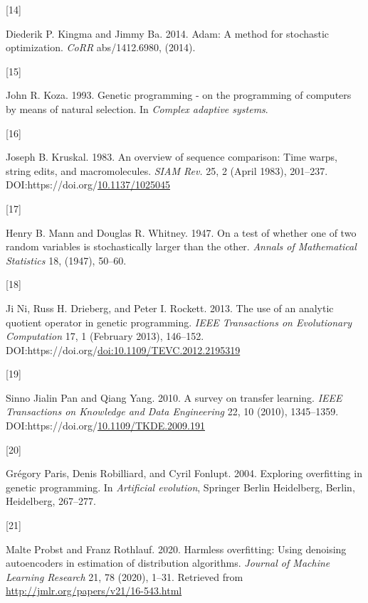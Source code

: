 \documentclass[
  11pt,
]{article}
\newlength{\cslhangindent}
\newlength{\csllabelwidth}
\newlength{\cslentryspacingunit} %
\newenvironment{CSLReferences}[2] %
 {%
  \setlength{\parindent}{0pt}
  \ifodd #1
  \let\oldpar\par
  \def\par{\hangindent=\cslhangindent\oldpar}
  \fi
  \setlength{\parskip}{#2\cslentryspacingunit}
 }%
 {}
\newcommand{\CSLLeftMargin}[1]{\parbox[t]{\csllabelwidth}{#1}}
\newcommand{\CSLRightInline}[1]{\parbox[t]{\linewidth - \csllabelwidth}{#1}\break}
\begin{document}
\begin{CSLReferences}{0}{0}
\leavevmode{}%
\CSLLeftMargin{{[}14{]} }%
\CSLRightInline{Diederik P. Kingma and Jimmy Ba. 2014. Adam: A method for stochastic optimization. \emph{CoRR} abs/1412.6980, (2014).}

\leavevmode{}%
\CSLLeftMargin{{[}15{]} }%
\CSLRightInline{John R. Koza. 1993. Genetic programming - on the programming of computers by means of natural selection. In \emph{Complex adaptive systems}.}

\leavevmode{}%
\CSLLeftMargin{{[}16{]} }%
\CSLRightInline{Joseph B. Kruskal. 1983. An overview of sequence comparison: Time warps, string edits, and macromolecules. \emph{SIAM Rev.} 25, 2 (April 1983), 201--237. DOI:https://doi.org/\href{https://doi.org/10.1137/1025045}{10.1137/1025045}}

\leavevmode{}%
\CSLLeftMargin{{[}17{]} }%
\CSLRightInline{Henry B. Mann and Douglas R. Whitney. 1947. On a test of whether one of two random variables is stochastically larger than the other. \emph{Annals of Mathematical Statistics} 18, (1947), 50--60.}

\leavevmode{}%
\CSLLeftMargin{{[}18{]} }%
\CSLRightInline{Ji Ni, Russ H. Drieberg, and Peter I. Rockett. 2013. The use of an analytic quotient operator in genetic programming. \emph{IEEE Transactions on Evolutionary Computation} 17, 1 (February 2013), 146--152. DOI:https://doi.org/\href{https://doi.org/doi:10.1109/TEVC.2012.2195319}{doi:10.1109/TEVC.2012.2195319}}

\leavevmode{}%
\CSLLeftMargin{{[}19{]} }%
\CSLRightInline{Sinno Jialin Pan and Qiang Yang. 2010. A survey on transfer learning. \emph{IEEE Transactions on Knowledge and Data Engineering} 22, 10 (2010), 1345--1359. DOI:https://doi.org/\href{https://doi.org/10.1109/TKDE.2009.191}{10.1109/TKDE.2009.191}}

\leavevmode{}%
\CSLLeftMargin{{[}20{]} }%
\CSLRightInline{Grégory Paris, Denis Robilliard, and Cyril Fonlupt. 2004. Exploring overfitting in genetic programming. In \emph{Artificial evolution}, Springer Berlin Heidelberg, Berlin, Heidelberg, 267--277.}

\leavevmode{}%
\CSLLeftMargin{{[}21{]} }%
\CSLRightInline{Malte Probst and Franz Rothlauf. 2020. Harmless overfitting: Using denoising autoencoders in estimation of distribution algorithms. \emph{Journal of Machine Learning Research} 21, 78 (2020), 1--31. Retrieved from \url{http://jmlr.org/papers/v21/16-543.html}}


\end{CSLReferences}
\end{document}
